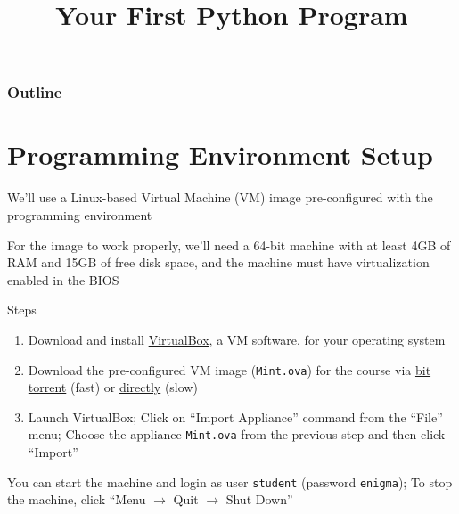 \documentclass[8pt,a4paper,compress]{beamer}
\title{Your First Python Program}
\date{}
\begin{document}
\begin{frame}
\vfill
\titlepage
\end{frame}

\begin{frame}
\frametitle{Outline}
\tableofcontents
\end{frame}

\section{Programming Environment Setup}
\begin{frame}[fragile]
We'll use a Linux-based Virtual Machine (VM) image pre-configured with the programming environment

\bigskip

For the image to work properly, we'll need a 64-bit machine with at least 4GB of RAM and 15GB of free disk space, and the machine must have virtualization enabled in the BIOS
 
\bigskip

Steps
\begin{enumerate}
\item Download and install \href{https://www.virtualbox.org/wiki/Downloads}{VirtualBox}, a VM software, for your operating system
\item Download the pre-configured VM image (\lstinline$Mint.ova$) for the course via \href{http://academictorrents.com/details/2b4e58481f020ec100bd9d6353ed450f2b61d788}{bit torrent} (fast) or \href{http://www.swamiiyer.net/teaching/Mint.ova}{directly} (slow)
\item Launch VirtualBox; Click on ``Import Appliance'' command from the ``File'' menu; Choose the appliance \lstinline{Mint.ova} from the previous step and then click ``Import''
\end{enumerate}

\bigskip

You can start the machine and login as user \lstinline{student} (password \lstinline{enigma}); To stop the machine, click ``Menu $\to$ Quit $\to$ Shut Down''
\end{frame}
\end{document}
